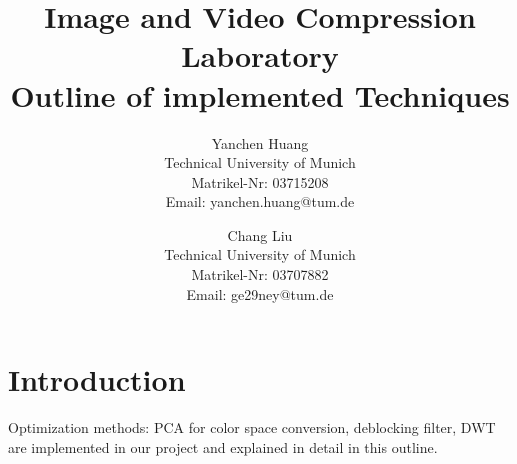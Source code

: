 \documentclass[twocolumn]{article}  %
\title{Image and Video Compression Laboratory\\Outline of implemented Techniques} %
\author{
\scriptsize Yanchen Huang\\[1ex] 
\scriptsize Technical University of Munich\\ %
\scriptsize Matrikel-Nr: 03715208\\ %
\scriptsize {Email: yanchen.huang@tum.de}\\ %
\and %
\scriptsize Chang Liu\\[1ex] 
\scriptsize Technical University of Munich\\ %
\scriptsize Matrikel-Nr: 03707882\\ %
\scriptsize {Email: ge29ney@tum.de}\\ 
}
\date{}
\begin{document}
\small
\maketitle


\section{Introduction}
Optimization methods: PCA for color space conversion, deblocking filter, DWT are implemented in our project and explained in detail in this outline. 
\end{document}
